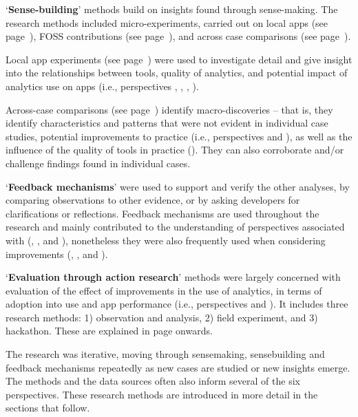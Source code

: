 `\textbf{Sense-building}' methods build on insights found through sense-making. The research methods included micro-experiments, carried out on local apps (see page~\pageref{local-app-experiments-research-method}), FOSS contributions (see page~\pageref{foss-contributions-research-methods}), and across case comparisons (see page~\pageref{across-case-comparisons-research-method}).

Local app experiments (see page~\pageref{local-app-experiments-research-method}) were used to investigate detail and give insight into the relationships between tools, quality of analytics, and potential impact of analytics use on apps (i.e., perspectives \uartefacts, \utools, \iartefacts, \itools).

Across-case comparisons (see page~\pageref{across-case-comparisons-research-method}) identify macro-discoveries -- that is, they identify characteristics and patterns that were not evident in individual case studies, potential improvements to practice (i.e., perspectives \uuse and \iuse), as well as the influence of the quality of tools in practice (\itools). They can also corroborate and/or challenge findings found in individual cases.


`\textbf{Feedback mechanisms}' were used to support and verify the other analyses, by comparing observations to other evidence, or by asking developers for clarifications or reflections. Feedback mechanisms are used throughout the research and mainly contributed to the understanding of perspectives associated with (\uuse, \uartefacts, and \utools), nonetheless they were also frequently used when considering improvements (\iuse, \iartefacts, and \itools). 

`\textbf{Evaluation through action research}' methods were largely concerned with evaluation of the effect of improvements in the use of analytics, in terms of adoption into use and app performance (i.e., perspectives \iuse and \iartefacts). It includes three research methods: 1) observation and analysis, 2) field experiment, and 3) hackathon. These are explained in page \pageref{section-evaluation-through-action-research-method} onwards. 

The research was iterative, moving through sensemaking, sensebuilding and feedback mechanisms repeatedly as new cases are studied or new insights emerge.  The methods and the data sources often also inform several of the six perspectives.  These research methods are introduced in more detail in the sections that follow.

